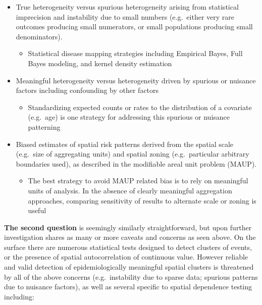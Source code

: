 \documentclass[
]{book}
\providecommand{\tightlist}{%
  \setlength{\itemsep}{0pt}\setlength{\parskip}{0pt}}
\begin{document}
\begin{itemize}
\tightlist
\item
  True heterogeneity versus spurious heterogeneity arising from statistical imprecision and instability due to small numbers (e.g.~either very rare outcomes producing small numerators, or small populations producing small denominators).

  \begin{itemize}
  \tightlist
  \item
    Statistical disease mapping strategies including Empirical Bayes, Full Bayes modeling, and kernel density estimation
  \end{itemize}
\item
  Meaningful heterogeneity versus heterogeneity driven by spurious or nuisance factors including confounding by other factors

  \begin{itemize}
  \tightlist
  \item
    Standardizing expected counts or rates to the distribution of a covariate (e.g.~age) is one strategy for addressing this spurious or nuisance patterning
  \end{itemize}
\item
  Biased estimates of spatial risk patterns derived from the spatial scale (e.g.~size of aggregating units) and spatial zoning (e.g.~particular arbitrary boundaries used), as described in the modifiable areal unit problem (MAUP).

  \begin{itemize}
  \tightlist
  \item
    The best strategy to avoid MAUP related bias is to rely on meaningful units of analysis. In the absence of clearly meaningful aggregation approaches, comparing sensitivity of results to alternate scale or zoning is useful
  \end{itemize}
\end{itemize}

\textbf{The second question} is seemingly similarly straightforward, but upon further investigation shares as many or more caveats and concerns as seen above. On the surface there are numerous statistical tests designed to detect clusters of events, or the presence of spatial autocorrelation of continuous value. However reliable and valid detection of epidemiologically meaningful spatial clusters is threatened by all of the above concerns (e.g.~instability due to sparse data; spurious patterns due to nuisance factors), as well as several specific to spatial dependence testing including:
\end{document}
